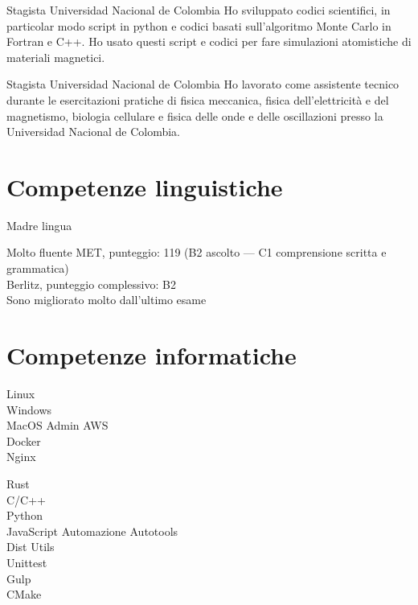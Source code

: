 \documentclass[12pt,english]{moderncv}
\begin{document}
        {Stagista}
        {Universidad Nacional de Colombia}
        {}
        {}
        {%
            Ho sviluppato codici scientifici, in particolar modo script in python e codici basati sull'algoritmo Monte Carlo in Fortran e C++. Ho usato questi script e codici per fare simulazioni atomistiche di materiali magnetici.
        }

        {Stagista}
        {Universidad Nacional de Colombia}
        {}
        {}
        {%
            Ho lavorato come assistente tecnico durante le esercitazioni pratiche di fisica meccanica, fisica dell'elettricit\`a e del magnetismo, biologia cellulare e fisica delle onde e delle oscillazioni presso la Universidad Nacional de Colombia.
        }


\section{Competenze linguistiche}

           {Madre lingua}
           {}

           {Molto fluente}
           {%
               MET, punteggio: 119 (B2 ascolto --- C1 comprensione scritta e grammatica)\\
               Berlitz, punteggio complessivo: B2\\
               Sono migliorato molto dall'ultimo esame
           }

\section{Competenze informatiche}

            {Linux\\Windows\\MacOS}
           {Admin}         {AWS\\Docker\\Nginx}

   {Rust\\C/C++\\Python\\JavaScript}
           {Automazione}    {Autotools\\Dist Utils\\Unittest\\Gulp\\CMake}
\end{document}
